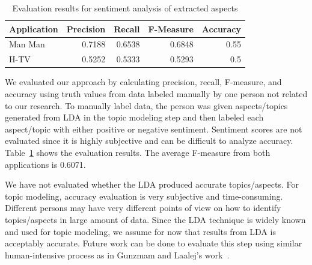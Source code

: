 \begin{table}[!htbp]
	\caption{Evaluation results for sentiment analysis of extracted aspects}
	\label{table:f-measureTopic}
	\centering
	\begin{tabular}{|l|r|r|r|r|}
		\hline
		\multicolumn{1}{|c|}{\textbf{Application}} & 
		\multicolumn{1}{|c|}{\textbf{Precision}} &
		\multicolumn{1}{|c|}{\textbf{Recall}} &
		\multicolumn{1}{|c|}{\textbf{F-Measure}} &
		\multicolumn{1}{|c|}{\textbf{Accuracy}} \\
		\hline
		Man Man & 0.7188 & 0.6538 & 0.6848 & 0.55\\
		\hline
		H-TV & 0.5252 & 0.5333 & 0.5293 & 0.5\\
		\hline
	\end{tabular}
\end{table}


We evaluated our approach by calculating precision, recall, F-measure, and accuracy using truth values from data labeled manually by one person not related to our research. To manually label data, the person was given aspects/topics generated from LDA in the topic modeling step and then labeled each aspect/topic with either positive or negative sentiment. Sentiment scores are not evaluated since it is highly subjective and can be difficult to analyze accuracy. Table~\ref{table:f-measureTopic} shows the evaluation results. The average F-measure from both applications is 0.6071. 

We have not evaluated whether the LDA produced accurate topics/aspects. For topic modeling, accuracy evaluation is very subjective and time-consuming. Different persons may have very different points of view on how to identify topics/aspects in large amount of data.  Since the LDA technique is widely known and used for topic modeling, we assume for now that results from LDA is acceptably accurate. Future work can be done to evaluate this step using similar human-intensive process as in Gunzmam and Laalej's work~\cite{userslikefeature}.

